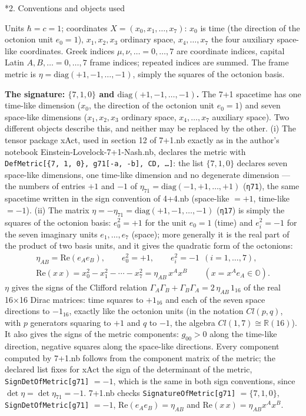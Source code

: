 \documentclass[10pt,a4paper]{article}
\makeatletter
\renewcommand\section{\@startsection{section}{1}{\z@}{-3.5ex \@plus -1ex \@minus -.2ex}{2.3ex \@plus.2ex}{\normalfont\Large\bfseries\raggedright}}
\makeatother
\begin{document}
\section*{2. Conventions and objects used}
Units $\hbar=c=1$; coordinates $X=(x_0,x_1,\dots,x_7)$: $x_0$ is time (the direction of the octonion unit $e_0=1$), $x_1,x_2,x_3$ ordinary space, $x_4,\dots,x_7$ the four auxiliary space-like coordinates. Greek indices $\mu,\nu,\dots=0,\dots,7$ are coordinate indices, capital Latin $A,B,\dots=0,\dots,7$ frame indices; repeated indices are summed. The frame metric is $\eta=\mathrm{diag}(+1,-1,\dots,-1)$, simply the squares of the octonion basis.

\textbf{The signature: $\{7,1,0\}$ and $\mathrm{diag}(+1,-1,\dots,-1)$.} The 7+1 spacetime has one time-like dimension ($x_0$, the direction of the octonion unit $e_0=1$) and seven space-like dimensions ($x_1,x_2,x_3$ ordinary space, $x_4,\dots,x_7$ auxiliary space). Two different objects describe this, and neither may be replaced by the other. (i) The tensor package xAct, used in section 12 of 7+1.nb exactly as in the author’s notebook Einstein-Lovelock-7+1-Nash.nb, declares the metric with \texttt{DefMetric[\{7, 1, 0\}, g71[-a, -b], CD, …]}: the list $\{7,1,0\}$ declares seven space-like dimensions, one time-like dimension and no degenerate dimension — the numbers of entries $+1$ and $-1$ of $\eta_{71}=\mathrm{diag}(-1,+1,\dots,+1)$ (\texttt{η71}), the same spacetime written in the sign convention of 4+4.nb (space-like $=+1$, time-like $=-1$). (ii) The matrix $\eta=-\eta_{71}=\mathrm{diag}(+1,-1,\dots,-1)$ (\texttt{η17}) is simply the squares of the octonion basis: $e_0^2=+1$ for the unit $e_0=1$ (time) and $e_i^2=-1$ for the seven imaginary units $e_1,\dots,e_7$ (space); more generally it is the real part of the product of two basis units, and it gives the quadratic form of the octonions:
\begin{gather*}
\eta_{AB}=\mathrm{Re}(e_Ae_B),\qquad e_0^2=+1,\qquad e_i^2=-1\ \ (i=1,\dots,7),\\ \mathrm{Re}(x\,x)=x_0^2-x_1^2-\cdots-x_7^2=\eta_{AB}\,x^Ax^B\qquad (x=x^Ae_A\in\mathbb O).
\end{gather*}
$\eta$ gives the signs of the Clifford relation $\Gamma_A\Gamma_B+\Gamma_B\Gamma_A=2\,\eta_{AB}\,1_{16}$ of the real 16×16 Dirac matrices: time squares to $+1_{16}$ and each of the seven space directions to $-1_{16}$, exactly like the octonion units (in the notation $Cl(p,q)$, with $p$ generators squaring to $+1$ and $q$ to $-1$, the algebra $Cl(1,7)\cong\mathbb R(16)$). It also gives the signs of the metric components: $g_{00}>0$ along the time-like direction, negative squares along the space-like directions. Every component computed by 7+1.nb follows from the component matrix of the metric; the declared list fixes for xAct the sign of the determinant of the metric, \texttt{SignDetOfMetric[g71]} $=-1$, which is the same in both sign conventions, since $\det \eta=\det \eta_{71}=-1$. 7+1.nb checks \texttt{SignatureOfMetric[g71]} $=\{7,1,0\}$, \texttt{SignDetOfMetric[g71]} $=-1$, $\mathrm{Re}(e_Ae_B)=\eta_{AB}$ and $\mathrm{Re}(x\,x)=\eta_{AB}x^Ax^B$.
\end{document}
